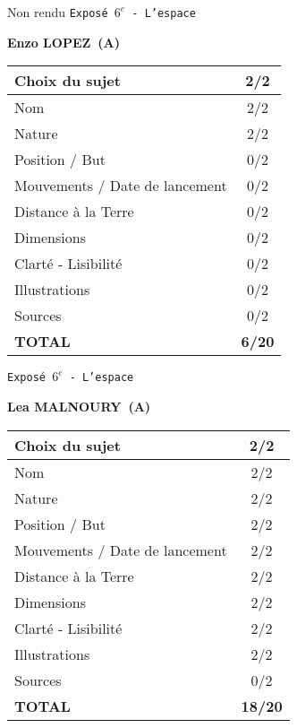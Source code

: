 	\vspace*{1cm}
	Non rendu
	\newpage
	\LARGE{\texttt{Expos\'e $6^e$ - L'espace}}
	\vspace*{1cm}

	\textbf{Enzo LOPEZ\ (A)}

	\vspace*{1.5cm}
	\begin{tabular}{|l|c|}
		\hline
		Choix du sujet & 2/2 \\
		\hline
		Nom & 2/2 \\
		\hline
		Nature & 2/2 \\
		\hline
		Position / But & 0/2 \\
		\hline
		Mouvements / Date de lancement & 0/2 \\
		\hline
		Distance \`a la Terre & 0/2 \\
		\hline
		Dimensions & 0/2 \\
		\hline
		Clart\'e - Lisibilit\'e & 0/2 \\
		\hline
		Illustrations & 0/2 \\
		\hline
		Sources & 0/2 \\
		\hline
		\textbf{TOTAL}  & \textbf{6/20} \\
		\hline
	\end{tabular}

	\vspace*{1cm}
	
	\newpage
	\LARGE{\texttt{Expos\'e $6^e$ - L'espace}}
	\vspace*{1cm}

	\textbf{Lea MALNOURY\ (A)}

	\vspace*{1.5cm}
	\begin{tabular}{|l|c|}
		\hline
		Choix du sujet & 2/2 \\
		\hline
		Nom & 2/2 \\
		\hline
		Nature & 2/2 \\
		\hline
		Position / But & 2/2 \\
		\hline
		Mouvements / Date de lancement & 2/2 \\
		\hline
		Distance \`a la Terre & 2/2 \\
		\hline
		Dimensions & 2/2 \\
		\hline
		Clart\'e - Lisibilit\'e & 2/2 \\
		\hline
		Illustrations & 2/2 \\
		\hline
		Sources & 0/2 \\
		\hline
		\textbf{TOTAL}  & \textbf{18/20} \\
		\hline
	\end{tabular}

